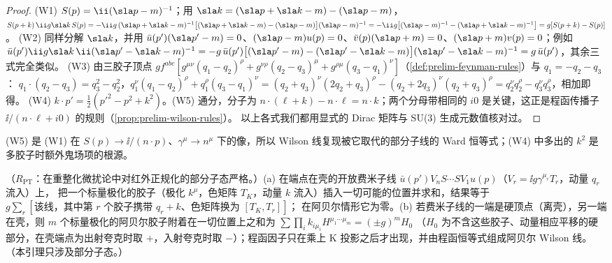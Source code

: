 \begin{proof}
(W1) $S(p)=\ii(\sla p-m)^{-1}$；用 $\sla k=(\sla p+\sla k-m)-(\sla p-m)$，
$S(p+k)\,\ii g\sla k\,S(p)=-\ii g\,(\sla p+\sla k-m)^{-1}\bigl[(\sla p+\sla k-m)-(\sla p-m)\bigr](\sla p-m)^{-1}=-\ii g\bigl[(\sla p-m)^{-1}-(\sla p+\sla k-m)^{-1}\bigr]=g[S(p+k)-S(p)]$。
(W2) 同样分解 $\sla k$，并用 $\bar u(p')(\sla p'-m)=0$、$(\sla p-m)u(p)=0$、$\bar v(p)(\sla p+m)=0$、$(\sla p+m)v(p)=0$；例如
$\bar u(p')\ii g\sla k\,\ii(\sla p'-\sla k-m)^{-1}=-g\,\bar u(p')\bigl[(\sla p'-m)-(\sla p'-\sla k-m)\bigr](\sla p'-\sla k-m)^{-1}=g\,\bar u(p')$，其余三式完全类似。
(W3) 由三胶子顶点 $gf^{abc}[g^{\mu\nu}(q_1-q_2)^\rho+g^{\nu\rho}(q_2-q_3)^\mu+g^{\rho\mu}(q_3-q_1)^\nu]$（\cref{def:prelim-feynman-rules}）与 $q_1=-q_2-q_3$：
$q_1\cdot(q_2-q_3)=q_3^2-q_2^2$，$q_1^\nu(q_1-q_2)^\rho+q_1^\rho(q_3-q_1)^\nu=(q_2+q_3)^\nu(2q_2+q_3)^\rho-(q_2+2q_3)^\nu(q_2+q_3)^\rho=q_2^\nu q_2^\rho-q_3^\nu q_3^\rho$，相加即得。
(W4) $k\cdot p'=\frac12(p'^2-p^2+k^2)$。(W5) 通分，分子为 $n\cdot(\ell+k)-n\cdot\ell=n\cdot k$；两个分母带相同的 $i0$ 是关键，这正是程函传播子 $\ii/(n\cdot\ell+i0)$ 的规则（\cref{prop:prelim-wilson-rules}）。
以上各式我们都用显式的 Dirac 矩阵与 SU(3) 生成元数值核对过。%
\end{proof}

(W5) 是 (W1) 在 $S(p)\to\ii/(n\cdot p)$、$\gamma^\mu\to n^\mu$ 下的像，所以 Wilson 线复现被它取代的部分子线的 Ward 恒等式；(W4) 中多出的 $k^2$ 是多胶子时额外鬼场项的根源。

\begin{lemma}\label{lem:method-ward-abelian}
（$R_{\mathrm{PT}}$：在重整化微扰论中对红外正规化的部分子态严格。）(a) 在端点在壳的开放费米子线 $\bar u(p')V_nS\cdots SV_1u(p)$（$V_r=\ii g\gamma^{\mu_r}T_r$，动量 $q_r$ 流入）上，
把一个标量极化的胶子（极化 $k^\mu$，色矩阵 $T_K$，动量 $k$ 流入）插入一切可能的位置并求和，结果等于 $g\sum_r[\text{该线，其中第 }r\text{ 个胶子携带 }q_r+k\text{、色矩阵换为 }[T_K,T_r]]$；
在阿贝尔情形它为零。(b) 若费米子线的一端是硬顶点（离壳），另一端在壳，则 $m$ 个标量极化的阿贝尔胶子附着在一切位置上之和为 $\sum\prod_ik_{i\mu_i}H^{\mu_1\cdots\mu_m}=(\pm g)^mH_0$
（$H_0$ 为不含这些胶子、动量相应平移的硬部分，在壳端点为出射夸克时取 $+$，入射夸克时取 $-$）；程函因子只在乘上 K 投影之后才出现，并由程函恒等式组成阿贝尔 Wilson 线。
（本引理只涉及部分子态。）
\end{lemma}

